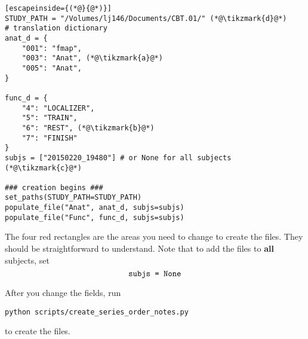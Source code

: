 \documentclass[12pt]{myland}
\def\<#1>{\texttt{#1}}
\begin{document}
\begin{lstlisting}[escapeinside={(*@}{@*)}]
STUDY_PATH = "/Volumes/lj146/Documents/CBT.01/" (*@\tikzmark{d}@*)
# translation dictionary
anat_d = {
    "001": "fmap", 
    "003": "Anat", (*@\tikzmark{a}@*)
    "005": "Anat",
}

func_d = {
    "4": "LOCALIZER", 
    "5": "TRAIN",
    "6": "REST", (*@\tikzmark{b}@*) 
    "7": "FINISH" 
}
subjs = ["20150220_19480"] # or None for all subjects   (*@\tikzmark{c}@*)  

### creation begins ###
set_paths(STUDY_PATH=STUDY_PATH)
populate_file("Anat", anat_d, subjs=subjs)
populate_file("Func", func_d, subjs=subjs)
\end{lstlisting}


The four red rectangles are the areas you need to change to create the files. They should be 
straightforward to understand. Note that to add the files to \textbf{all} subjects, set
\[\text{\<subjs = None>}\]

After you change the fields, run
    \begin{lstlisting}[xleftmargin=.2\textwidth, xrightmargin=.2\textwidth, backgroundcolor=\color{lightgray}]
    python scripts/create_series_order_notes.py
    \end{lstlisting}        
to create the files. \par
\end{document}
